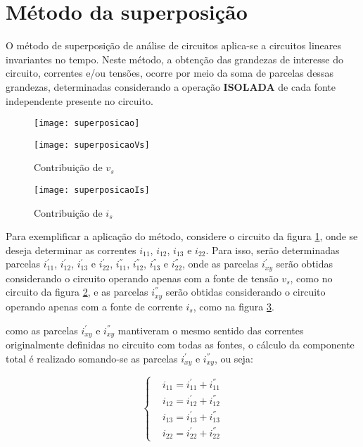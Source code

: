 \documentclass[12pt,fleqn]{book} %
\begin{document}
\section{Método da superposição}{

O método de superposição de análise de circuitos aplica-se a circuitos lineares invariantes no tempo. Neste método, a obtenção das grandezas de interesse do circuito, correntes e/ou tensões, ocorre por meio da soma de parcelas dessas grandezas, determinadas considerando a operação \textbf{ISOLADA} de cada fonte independente presente no circuito.

        \begin{figure}[!htbp] \centering\texttt{[image: superposicao]}
            \caption{}\label{superposicao} 
        \end{figure}
        
        \begin{figure}[!htbp] \centering\texttt{[image: superposicaoVs]}
            \caption{Contribuição de $v_s$}\label{superposicaoVs} 
        \end{figure}
        
        \begin{figure}[!htbp] \centering\texttt{[image: superposicaoIs]}
            \caption{Contribuição de $i_s$}\label{superposicaoIs} 
        \end{figure}

Para exemplificar a aplicação do método, considere o circuito da figura \ref{superposicao}, onde se deseja determinar as correntes $i_{11}$, $i_{12}$, $i_{13}$ e $i_{22}$. Para isso, serão determinadas parcelas $i_{11}^{'}$, $i_{12}^{'}$, $i_{13}^{'}$ e $i_{22}^{'}$, $i_{11}^{''}$, $i_{12}^{''}$, $i_{13}^{''}$ e $i_{22}^{''}$, onde as parcelas $i_{xy}^{'}$ serão obtidas considerando o circuito operando apenas com a fonte de tensão $v_s$, como no circuito da figura \ref{superposicaoVs}, e as parcelas $i_{xy}^{''}$ serão obtidas considerando o circuito operando apenas com a fonte de corrente $i_s$, como na figura \ref{superposicaoIs}.

como as parcelas $i_{xy}^{'}$ e $i_{xy}^{''}$ mantiveram o mesmo sentido das correntes originalmente definidas no circuito com todas as fontes, o cálculo da componente total é realizado somando-se as parcelas $i_{xy}^{'}$ e $i_{xy}^{''}$, ou seja:

\begin{equation}
\left\{\begin{aligned} & 
        i_{11}=i_{11}^{'}+i_{11}^{''}\\& 
        i_{12}=i_{12}^{'}+i_{12}^{''}\\& 
        i_{13}=i_{13}^{'}+i_{13}^{''}\\&
        i_{22}=i_{22}^{'}+i_{22}^{''}
    \end{aligned}\right.
\end{equation}

}
\end{document}

